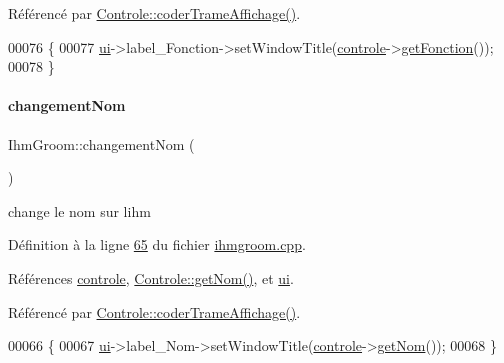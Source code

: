 Référencé par \hyperlink{controle_8cpp_source_l00101}{Controle\+::coder\+Trame\+Affichage()}.


\begin{DoxyCode}
00076 \{
00077     \hyperlink{class_ihm_groom_af652e1ce199213b7867e44cf589c06b8}{ui}->label\_Fonction->setWindowTitle(\hyperlink{class_ihm_groom_acead732c303b50a3285bd311ac8a3b4f}{controle}->\hyperlink{class_controle_a8d2891b2b01c503d10f775b4b14a3777}{getFonction}());
00078 \}
\end{DoxyCode}
\mbox{\label{class_ihm_groom_aa270d1fb6a7a9c1385c4ae3e67451ea0}} 
\paragraph{\texorpdfstring{changement\+Nom}{changementNom}}
{\footnotesize\ttfamily Ihm\+Groom\+::changement\+Nom (\begin{DoxyParamCaption}{ }\end{DoxyParamCaption})\hspace{0.3cm}{\ttfamily [slot]}}



change le nom sur l\textquotesingle{}ihm 



Définition à la ligne \hyperlink{ihmgroom_8cpp_source_l00065}{65} du fichier \hyperlink{ihmgroom_8cpp_source}{ihmgroom.\+cpp}.



Références \hyperlink{ihmgroom_8h_source_l00089}{controle}, \hyperlink{controle_8cpp_source_l00080}{Controle\+::get\+Nom()}, et \hyperlink{ihmgroom_8h_source_l00085}{ui}.



Référencé par \hyperlink{controle_8cpp_source_l00101}{Controle\+::coder\+Trame\+Affichage()}.


\begin{DoxyCode}
00066 \{
00067     \hyperlink{class_ihm_groom_af652e1ce199213b7867e44cf589c06b8}{ui}->label\_Nom->setWindowTitle(\hyperlink{class_ihm_groom_acead732c303b50a3285bd311ac8a3b4f}{controle}->\hyperlink{class_controle_ac6e8590a5108e97fce3ce3aa43feb881}{getNom}());
00068 \}
\end{DoxyCode}
\mbox{\label{class_ihm_groom_a2e8db190224f15326552a5bd642a9347}} 
